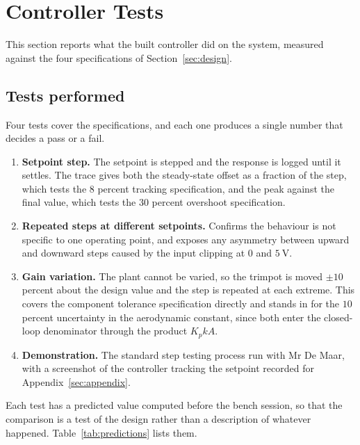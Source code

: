 \section{Controller Tests}\label{sec:tests}
This section reports what the built controller did on the system, measured against the four
specifications of Section~\ref{sec:design}.

\subsection{Tests performed}
Four tests cover the specifications, and each one produces a single number that decides a pass
or a fail.

\begin{enumerate}
    \item \textbf{Setpoint step.} The setpoint is stepped and the response is logged until it
    settles. The trace gives both the steady-state offset as a fraction of the step, which tests
    the $8$ percent tracking specification, and the peak against the final value, which tests
    the $30$ percent overshoot specification.
    \item \textbf{Repeated steps at different setpoints.} Confirms the behaviour is not specific
    to one operating point, and exposes any asymmetry between upward and downward steps caused
    by the input clipping at $0$ and $5\ \mathrm{V}$.
    \item \textbf{Gain variation.} The plant cannot be varied, so the trimpot is moved $\pm 10$
    percent about the design value and the step is repeated at each extreme. This covers the
    component tolerance specification directly and stands in for the $10$ percent uncertainty in
    the aerodynamic constant, since both enter the closed-loop denominator through the product
    $K_p k A$.
    \item \textbf{Demonstration.} The standard step testing process run with Mr De Maar, with a
    screenshot of the controller tracking the setpoint recorded for
    Appendix~\ref{sec:appendix}.
\end{enumerate}

Each test has a predicted value computed before the bench session, so that the comparison is a
test of the design rather than a description of whatever happened. Table~\ref{tab:predictions}
lists them.

